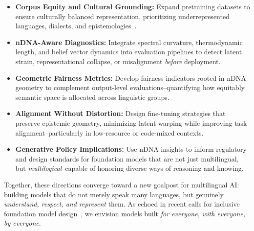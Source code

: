 \begin{itemize}[leftmargin=1.5em]
    \item \textbf{Corpus Equity and Cultural Grounding:} Expand pretraining datasets to ensure culturally balanced representation, prioritizing underrepresented languages, dialects, and epistemologies~\citep{adelani2021massively, orife2020masakhane}.
    
    \item \textbf{nDNA-Aware Diagnostics:} Integrate spectral curvature, thermodynamic length, and belief vector dynamics into evaluation pipelines to detect latent strain, representational collapse, or misalignment \emph{before} deployment.

    \item \textbf{Geometric Fairness Metrics:} Develop fairness indicators rooted in nDNA geometry to complement output-level evaluations--quantifying how equitably semantic space is allocated across linguistic groups.

    \item \textbf{Alignment Without Distortion:} Design fine-tuning strategies that preserve epistemic geometry, minimizing latent warping while improving task alignment--particularly in low-resource or code-mixed contexts.

    \item \textbf{Generative Policy Implications:} Use nDNA insights to inform regulatory and design standards for foundation models that are not just multilingual, but \emph{multilogical}--capable of honoring diverse ways of reasoning and knowing.
\end{itemize}

Together, these directions converge toward a new goalpost for multilingual AI: building models that do not merely speak many languages, but genuinely \emph{understand, respect, and represent} them. As echoed in recent calls for inclusive foundation model design~\citep{Mihalcea_Ignat_Bai_Borah_Chiruzzo_Jin_Kwizera_Nwatu_Poria_Solorio_2025}, we envision models built \emph{for everyone, with everyone, by everyone}.